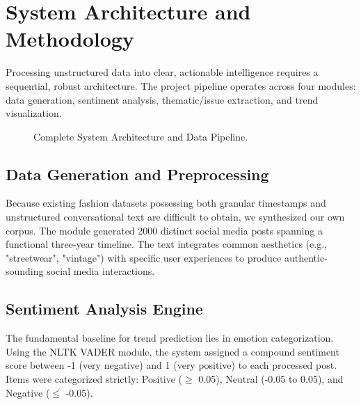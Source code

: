 \documentclass[conference]{IEEEtran}
\begin{document}
\section{System Architecture and Methodology}
\label{sec:methodology}
Processing unstructured data into clear, actionable intelligence requires a sequential, robust architecture. The project pipeline operates across four modules: data generation, sentiment analysis, thematic/issue extraction, and trend visualization.

\begin{figure}[htbp]
\centering
\fbox{\rule{0pt}{2in} \rule{0.9\linewidth}{0pt}}
\caption{Complete System Architecture and Data Pipeline.}
\label{fig:architecture}
\end{figure}

\subsection{Data Generation and Preprocessing}
Because existing fashion datasets possessing both granular timestamps and unstructured conversational text are difficult to obtain, we synthesized our own corpus. The module generated 2000 distinct social media posts spanning a functional three-year timeline. The text integrates common aesthetics (e.g., "streetwear", "vintage") with specific user experiences to produce authentic-sounding social media interactions.

\subsection{Sentiment Analysis Engine}
The fundamental baseline for trend prediction lies in emotion categorization. Using the NLTK VADER module, the system assigned a compound sentiment score between -1 (very negative) and 1 (very positive) to each processed post. Items were categorized strictly: Positive ($\ge$ 0.05), Neutral (-0.05 to 0.05), and Negative ($\le$ -0.05).
\end{document}
